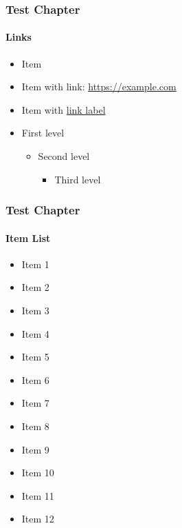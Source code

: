 \begin{frame}
	\frametitle{Test Chapter}
	\framesubtitle{Links}

	\begin{itemize}
		\item Item
		\item Item with link: \url{https://example.com}
		\item Item with \href{https://example.com}{link label}

		\item First level
		\begin{itemize}
			\item Second level
			\begin{itemize}
				\item Third level
			\end{itemize}
		\end{itemize}

	\end{itemize}

\end{frame}


\begin{frame}
	\frametitle{Test Chapter}
	\framesubtitle{Item List}

	\begin{itemize}
		\item Item 1
		\item Item 2
		\item Item 3
		\item Item 4
		\item Item 5
		\item Item 6
		\item Item 7
		\item Item 8
		\item Item 9
		\item Item 10
		\item Item 11
		\item Item 12
	\end{itemize}

\end{frame}


